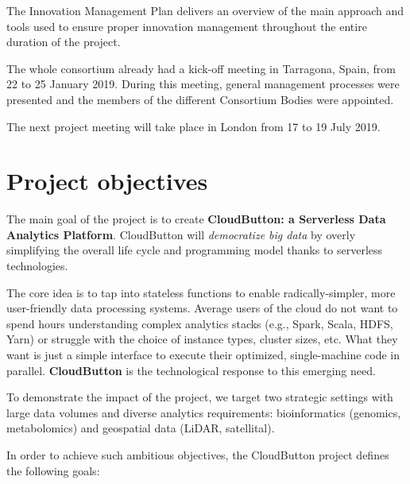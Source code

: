 \documentclass[a4paper,11pt]{article}
\newcommand{\proj}{CloudButton\xspace}
\begin{document}
The Innovation Management Plan delivers an overview of the main approach and tools used to ensure proper innovation management throughout the entire duration of the project.

The whole consortium already had a kick-off meeting in Tarragona, Spain, from 22 to 25 January 2019. During this meeting, general management processes were presented and the members of the different Consortium Bodies were appointed.

The next project meeting will take place in London from 17 to 19 July 2019.

\newpage

\section{Project objectives}
\label{sec:objectives}

The main goal of the project is to create\textbf{ \proj: a Serverless Data Analytics Platform}. \proj will \textit{democratize big data} by overly simplifying the overall life cycle and programming model thanks to serverless technologies. 

The core idea is to tap into stateless functions to enable radically-simpler, more user-friendly data processing systems. Average users of the cloud do not want to spend hours
understanding complex analytics stacks (e.g., Spark, Scala, HDFS, Yarn) or struggle with the choice of instance types, cluster sizes, etc.  What they want is just a simple interface to execute their 
optimized, single-machine code in parallel. \textbf{\proj} is the technological response to this emerging need.

To demonstrate the impact of the project, we target two strategic settings with large data volumes and diverse analytics requirements: bioinformatics (genomics, metabolomics) and geospatial data (LiDAR, satellital).

In order to achieve such ambitious objectives, the \proj project defines the following goals:
\end{document}
